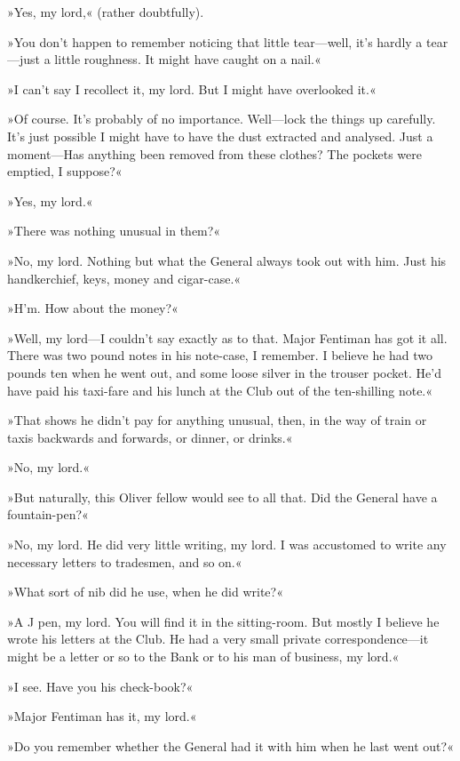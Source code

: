»Yes, my lord,« (rather doubtfully).

»You don't happen to remember noticing that little tear\allowbreak---\allowbreak well, it's hardly a tear\allowbreak---\allowbreak just a little roughness. It might have caught on a nail.«

»I can't say I recollect it, my lord. But I might have overlooked it.«

»Of course. It's probably of no importance. Well\allowbreak---\allowbreak lock the things up carefully. It's just possible I might have to have the dust extracted and analysed. Just a moment\allowbreak---\allowbreak Has anything been removed from these clothes? The pockets were emptied, I suppose?«

»Yes, my lord.«

»There was nothing unusual in them?«

»No, my lord. Nothing but what the General always took out with him. Just his handkerchief, keys, money and cigar-case.«

»H'm. How about the money?«

»Well, my lord\allowbreak---\allowbreak I couldn't say exactly as to that. Major Fentiman has got it all. There was two pound notes in his note-case, I remember. I believe he had two pounds ten when he went out, and some loose silver in the trouser pocket. He'd have paid his taxi-fare and his lunch at the Club out of the ten-shilling note.«

»That shows he didn't pay for anything unusual, then, in the way of train or taxis backwards and forwards, or dinner, or drinks.«

»No, my lord.«

»But naturally, this Oliver fellow would see to all that. Did the General have a fountain-pen?«

»No, my lord. He did very little writing, my lord. I was accustomed to write any necessary letters to tradesmen, and so on.«

»What sort of nib did he use, when he did write?«

»A J pen, my lord. You will find it in the sitting-room. But mostly I believe he wrote his letters at the Club. He had a very small private correspondence\allowbreak---\allowbreak it might be a letter or so to the Bank or to his man of business, my lord.«

»I see. Have you his check-book?«

»Major Fentiman has it, my lord.«

»Do you remember whether the General had it with him when he last went out?«


